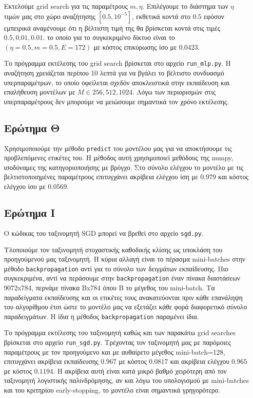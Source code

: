 \documentclass{article}
\newcommand{\code}{\texttt}
\begin{document}
Εκτελούμε grid search για τις παραμέτρους $m, \eta$. Επιλέγουμε το διάστημα των $\eta$ τιμών μας στο χώρο αναζήτησης $[0.5, 10^{-5}]$, εκθετικά κοντά στο $0.5$ εφόσον εμπειρικά αναμένουμε ότι η βέλτιστη τιμή της θα βρίσκεται κοντά στις τιμές $0.5, 0.01, 0.01$.  το οποίο για το συγκεκριμένο δίκτυο είναι το $(\eta=0.5, m=0.5, E=172)$ με κόστος επικύρωσης ίσο με $0.0423$.

Το πρόγραμμα εκτέλεσης του grid search βρίσκεται στο αρχείο \code{run\_mlp.py}. Η αναζήτηση χρειάζεται περίπου 10 λεπτά για να βγάλει το βέλτιστο συνδυασμό υπερπαραμέτρων, το οποίο οφείλεται σχεδόν αποκλειστικά στην εκπαίδευση και επαλήθευση μοντέλων με $M \in {256, 512, 1024}$. Λόγω των περιορισμών στις υπερπαραμέτρους δεν μπορούμε να μειώσουμε σημαντικά τον χρόνο εκτέλεσης.


\subsection{Ερώτημα Θ}

Χρησιμοποιούμε την μέθοδο \code{predict} του μοντέλου μας για να αποκτήσουμε τις προβλεπόμενες ετικέτες του. Η μέθοδος αυτή χρησιμοποιεί μεθόδους της numpy, ισοδύναμες της κατηγοριοποιήσης με βρόγχο. Στο σύνολο ελέγχου το μοντέλο με τις βελτιστοποιημένες παραμέτρους επιτυγχάνει ακρίβεια ελέγχου ίση με $0.979$ και κόστος ελέγχου ίσο με $0.0569$.

\subsection{Ερώτημα Ι}

Ο κώδικας του ταξινομητή SGD μπορεί να βρεθεί στο αρχείο \code{sgd.py}.

Υλοποιούμε τον ταξινομητή στοχαστικής καθοδικής κλίσης ως υποκλάση του προηγούμενού μας ταξινομητή. Η κύρια αλλαγή είναι το πέρασμα mini-batches στην μέθοδο \code{backpropagation} αντί για το σύνολο των δειγμάτων εκπαίδευσης. Πιο συγκεκριμένα, αντί να περάσουμε στην \code{backpropagation} έναν πίνακα διαστάσεων 9072x784, περνάμε πίνακα Βx784 όπου Β το μέγεθος του mini-batch. Τα παραδείγματα εκπαίδευσης και οι ετικέτες τους ανακατεύονται πριν κάθε επανάληψη του αλγορίθμου έτσι ώστε το μοντέλο μας να εξετάζει κάθε φορά διαφορετικό σύνολο παραδειγμάτων. Η ίδια η μέθοδος \code{backpropagation} παραμένει ίδια.


 Το πρόγραμμα εκτέλεσης του ταξινομητή καθώς και των παρακάτω grid searches βρίσκεται στο αρχείο \code{run\_sgd.py}. Τρέχοντας τον ταξινομητή μας με παρόμοιες παραμέτρους με τον προηγούμενο και με αυθαίρετο μέγεθος mini-batch=128, επιτυγχάνει ακρίβεια εκπαίδευσης $0.967$ με κόστος $0.0817$ και ακρίβεια ελέγχου $0.965$ με κόστος $0.1194$. Η ακρίβεια αυτή είναι κατά μικρό βαθμό χειρότερη από τον ταξινομητή λογιστικής παλινδρόμησης, αν και λόγω του υπολογισμού με mini-batches και του κριτηρίου early-stopping, το μοντέλο είναι σημαντικά γρηγορότερο.
 
\end{document}
